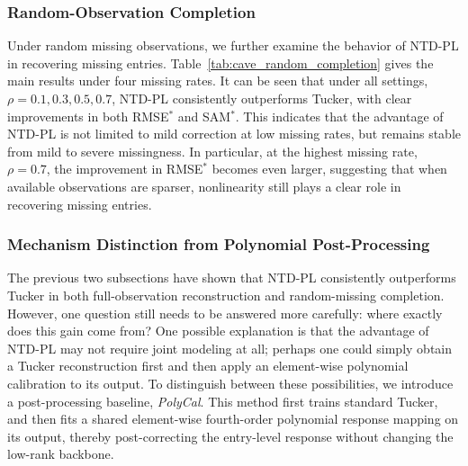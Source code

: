 \subsubsection{Random-Observation Completion}

Under random missing observations, we further examine the behavior of NTD-PL in recovering missing entries. Table~\ref{tab:cave_random_completion} gives the main results under four missing rates. It can be seen that under all settings, $\rho=0.1,0.3,0.5,0.7$, NTD-PL consistently outperforms Tucker, with clear improvements in both RMSE$^\ast$ and SAM$^\ast$. This indicates that the advantage of NTD-PL is not limited to mild correction at low missing rates, but remains stable from mild to severe missingness. In particular, at the highest missing rate, $\rho=0.7$, the improvement in RMSE$^\ast$ becomes even larger, suggesting that when available observations are sparser, nonlinearity still plays a clear role in recovering missing entries.

\begin{table}[htbp]
    \centering
    \caption{Main results for random-missing completion on CAVE. Under all four missing rates, NTD-PL outperforms Tucker, showing that the gain directly manifests in the recovery quality at the missing entries.}
    \label{tab:cave_random_completion}
    \small
    
\end{table}

\begin{table}[htbp]
    \centering
    \caption{Scene-level comparison for random-missing completion on CAVE. Under all missing rates, the difference is uniformly defined as Tucker $-$ NTD-PL, so positive values indicate that NTD-PL is better. The results show that the completion gain is significantly consistent at the scene level across different missing rates.}
    \label{tab:cave_completion_significance}
    \small
    
\end{table}

\subsubsection{Mechanism Distinction from Polynomial Post-Processing}

The previous two subsections have shown that NTD-PL consistently outperforms Tucker in both full-observation reconstruction and random-missing completion. However, one question still needs to be answered more carefully: where exactly does this gain come from? One possible explanation is that the advantage of NTD-PL may not require joint modeling at all; perhaps one could simply obtain a Tucker reconstruction first and then apply an element-wise polynomial calibration to its output. To distinguish between these possibilities, we introduce a post-processing baseline, \emph{PolyCal}. This method first trains standard Tucker, and then fits a shared element-wise fourth-order polynomial response mapping on its output, thereby post-correcting the entry-level response without changing the low-rank backbone.

